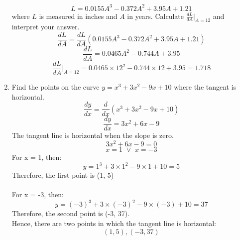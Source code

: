 \documentclass[12pt]{article}
\begin{document}
\begin{enumerate}
            \[L = 0.0155A^3 - 0.372A^2 + 3.95A + 1.21\]
            where $L$ is measured in inches and $A$ in years. Calculate ${\displaystyle \frac{dL}{dA}|_{A = 12}}$ and interpret your answer.
            \[{\displaystyle \frac{dL}{dA} = \frac{dL}{dA}(0.0155A^3 - 0.372A^2 + 3.95A + 1.21)}\]
            \[{\displaystyle \frac{dL}{dA} = 0.0465A^2 - 0.744A + 3.95}\]
            \[\boxed{\displaystyle \frac{dL}{dA}|_{A = 12} = 0.0465 \times 12^2 - 0.744\times12 + 3.95 = 1.718}\]
            \noindent{}
            \setcounter{enumi}{86}
      \item Find the points on the curve $y = x^3 + 3x^2 - 9x + 10$ where the tangent is horizontal.
            \[{\displaystyle \frac{dy}{dx} = \frac{d}{dx}(x^3 + 3x^2 - 9x + 10)}\]
            \[{\displaystyle \frac{dy}{dx} = 3x^2 + 6x - 9}\]
            The tangent line is horizontal when the slope is zero.
            \[{\displaystyle 3x^2 + 6x - 9 = 0}\]
            \[x = 1 \text{~} \vee \text{~} x = -3\]
            For x = 1, then:
            \[y = 1^3 + 3 \times 1^2 - 9 \times 1 + 10 = 5\]
            Therefore, the first point is (1, 5)\\~\\
            For x = -3, then:
            \[y = (-3)^3 + 3 \times (-3)^2 - 9 \times (-3) + 10 = 37\]
            Therefore, the second point is (-3, 37).\\
            Hence, there are two points in which the tangent line is horizontal: 
            \[\boxed{(1,5),(-3,37)}\]
\end{enumerate}
\end{document}
